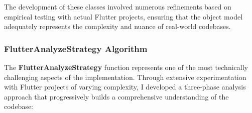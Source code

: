 The development of these classes involved numerous refinements based on empirical testing with actual Flutter projects, ensuring that the object model adequately represents the complexity and nuance of real-world codebases.

\subsubsection{FlutterAnalyzeStrategy Algorithm}

The \textbf{FlutterAnalyzeStrategy} function represents one of the most technically challenging aspects of the implementation. Through extensive experimentation with Flutter projects of varying complexity, I developed a three-phase analysis approach that progressively builds a comprehensive understanding of the codebase:

